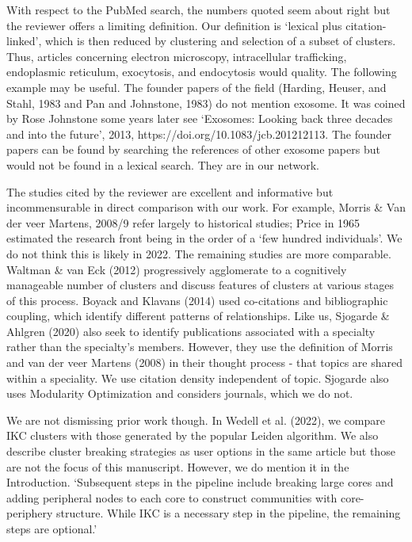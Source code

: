 \documentclass[11pt, oneside]{article}   	%
\begin{document}
With respect to the PubMed search, the numbers quoted seem about right but the reviewer offers a limiting definition. Our definition is `lexical plus citation-linked', which is then reduced by clustering and selection of a subset of clusters. Thus, articles concerning electron microscopy, intracellular trafficking, endoplasmic reticulum, exocytosis, and endocytosis would quality. The following example may be useful. The founder papers of the field (Harding, Heuser, and Stahl, 1983 and Pan and Johnstone, 1983) do not mention exosome. It was coined by Rose Johnstone some years later see `Exosomes: Looking back three decades and into the future', 2013, https://doi.org/10.1083/jcb.201212113. The founder papers can be found by searching the references of other exosome papers but would not be found in a lexical search. They are in our network.


The studies cited by the reviewer are excellent and informative but incommensurable in direct comparison with our work. For example, Morris \& Van der veer Martens, 2008/9 refer largely to historical studies; Price in 1965 estimated  the research front being in the order of a `few hundred individuals'. We do not think this is likely in 2022. The remaining studies are more comparable. Waltman \& van Eck (2012) progressively agglomerate to a cognitively manageable number of clusters and discuss features of clusters at various stages of this process. Boyack and Klavans (2014) used co-citations and bibliographic coupling, which identify different patterns of relationships. Like us, Sjogarde \& Ahlgren (2020) also seek to identify publications associated with a specialty rather than the specialty's members. However, they use the definition of Morris and van der veer Martens (2008) in their thought process - that topics are shared within a speciality. We use citation density independent of topic. Sjogarde also uses Modularity Optimization and considers journals, which we do not.

We are not dismissing prior work though. In Wedell et al. (2022), we compare IKC clusters with those generated by the popular Leiden algorithm. We also describe cluster breaking strategies as user options in the same article but those are not the focus of this manuscript. However, we do mention it in the Introduction. `Subsequent steps in the pipeline include breaking large cores and adding peripheral nodes to each core to construct communities with core-periphery structure. While IKC is a necessary step in the pipeline, the remaining steps are optional.'
\end{document}

